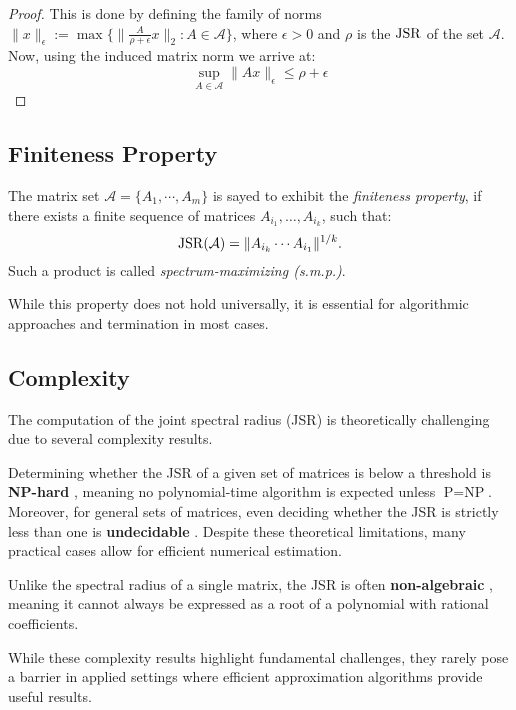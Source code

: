 \begin{proof}
    This is done by defining the family of norms $\|x\|_{\epsilon} := \max \{ \| \frac{A}{\rho + \epsilon}x\|_2 : A \in \mathcal{A}\}$,
    where $\epsilon > 0$ and $\rho$ is the $\operatorname{JSR}$ of the set $\mathcal{A}$.
    Now, using the induced matrix norm we arrive at: 
    $$ \sup _{A \in \mathcal{A}} \|Ax\|_{\epsilon} \leq \rho + \epsilon$$

\end{proof}

\subsection*{Finiteness Property}
\begin{definition}
    The matrix set $\mathcal{A} = \{ A_1, \cdots, A_m\}$ is sayed to exhibit the \emph{finiteness property}, if there exists a finite sequence of matrices $A_{i_1}, \dots, A_{i_k}$, such that:
    \begin{equation}
    \operatorname{JSR}(\mathcal{A}) = \|A_{i_k} \cdots A_{i_1}\|^{1/k}.
    \end{equation}
    Such a product is called \emph{spectrum-maximizing (s.m.p.)}.
\end{definition}
While this property does not hold universally, it is essential for algorithmic approaches and termination in most cases.

\subsection*{Complexity}

The computation of the joint spectral radius (JSR) is theoretically challenging due to several complexity results.

Determining whether the JSR of a given set of matrices is below a threshold is \textbf{NP-hard} \citep{tsitsiklis1997lyapunov}, meaning no polynomial-time algorithm is expected unless $\text{P} = \text{NP}$. Moreover, for general sets of matrices, even deciding whether the JSR is strictly less than one is \textbf{undecidable} \citep{blondel2000boundedness}. Despite these theoretical limitations, many practical cases allow for efficient numerical estimation.

Unlike the spectral radius of a single matrix, the JSR is often \textbf{non-algebraic} \citep{guglielmiExactComputationJoint2011}, meaning it cannot always be expressed as a root of a polynomial with rational coefficients.

While these complexity results highlight fundamental challenges, they rarely pose a barrier in applied settings where efficient approximation algorithms provide useful results.

